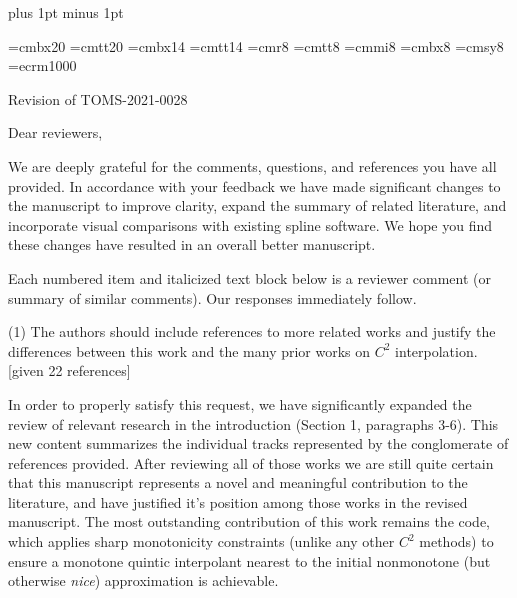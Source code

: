 
\parindent=0pt
\parskip=9pt
\baselineskip=13pt plus 1pt minus 1pt \lineskiplimit=1pt


\def\BEGINC{\textRed}
\def\ENDC{\textBlack}
\def\red#1{\BEGINC#1\ENDC}
\let\beginred=\BEGINC
\let\endred=\ENDC

\font\titlebf=cmbx20
\font\titlett=cmtt20
\font\headingbf=cmbx14
\font\headingtt=cmtt14
\font\caprm=cmr8
\font\captt=cmtt8
\font\capit=cmmi8
\font\capbf=cmbx8
\font\capsy=cmsy8
\def\captext{
  \narrower
  \noindent
  \caprm
  \baselineskip=10pt plus 2pt minus 1pt
  \lineskiplimit=2pt
  \lineskip=2pt plus 1pt
  \parskip=0pt
  \textfont0=\caprm
  \textfont1=\capit
  \textfont2=\capsy
}
\font\underscorefont=ecrm1000
\def\_{{\underscorefont\char"5F}}




{\titlebf Revision of {\titlett TOMS-2021-0028} \bigskip}

Dear reviewers,

We are deeply grateful for the comments, questions, and references you
have all provided. In accordance with your feedback we have made
significant changes to the manuscript to improve clarity, expand the
summary of related literature, and incorporate visual comparisons with
existing spline software. We hope you find these changes have resulted
in an overall better manuscript.

Each numbered item and italicized text block below is a reviewer
comment (or summary of similar comments). Our responses immediately
follow.


\goodbreak
{\parindent=20pt \it

\item{(1)} The authors should include references to more related works
  and justify the differences between this work and the many prior
  works on $C^2$ interpolation. [given 22 references]

}

In order to properly satisfy this request, we have significantly
expanded the review of relevant research in the introduction (Section
1, paragraphs 3-6). This new content summarizes the individual tracks
represented by the conglomerate of references provided. After
reviewing all of those works we are still quite certain that this
manuscript represents a novel and meaningful contribution to the
literature, and have justified it's position among those works in the
revised manuscript. The most outstanding contribution of this work
remains the code, which applies sharp monotonicity constraints (unlike
any other $C^2$ methods) to ensure a monotone quintic interpolant
nearest to the initial nonmonotone (but otherwise {\it nice})
approximation is achievable.


